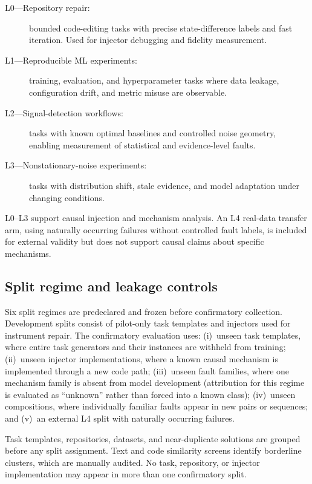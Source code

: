 \begin{description}
    \item[L0---Repository repair:] bounded code-editing tasks with precise
          state-difference labels and fast iteration. Used for injector
          debugging and fidelity measurement.
    \item[L1---Reproducible ML experiments:] training, evaluation, and
          hyperparameter tasks where data leakage, configuration drift, and
          metric misuse are observable.
    \item[L2---Signal-detection workflows:] tasks with known optimal
          baselines and controlled noise geometry, enabling measurement of
          statistical and evidence-level faults.
    \item[L3---Nonstationary-noise experiments:] tasks with distribution
          shift, stale evidence, and model adaptation under changing
          conditions.
\end{description}

L0--L3 support causal injection and mechanism analysis. An L4 real-data
transfer arm, using naturally occurring failures without controlled fault
labels, is included for external validity but does not support causal claims
about specific mechanisms.

\subsection{Split regime and leakage controls}

Six split regimes are predeclared and frozen before confirmatory collection.
Development splits consist of pilot-only task templates and injectors used
for instrument repair. The confirmatory evaluation uses: (i)~unseen task
templates, where entire task generators and their instances are withheld
from training; (ii)~unseen injector implementations, where a known causal
mechanism is implemented through a new code path; (iii)~unseen fault
families, where one mechanism family is absent from model development
(attribution for this regime is evaluated as ``unknown'' rather than forced
into a known class); (iv)~unseen compositions, where individually familiar
faults appear in new pairs or sequences; and (v)~an external L4 split with
naturally occurring failures.

Task templates, repositories, datasets, and near-duplicate solutions are
grouped before any split assignment. Text and code similarity screens
identify borderline clusters, which are manually audited. No task,
repository, or injector implementation may appear in more than one
confirmatory split.

